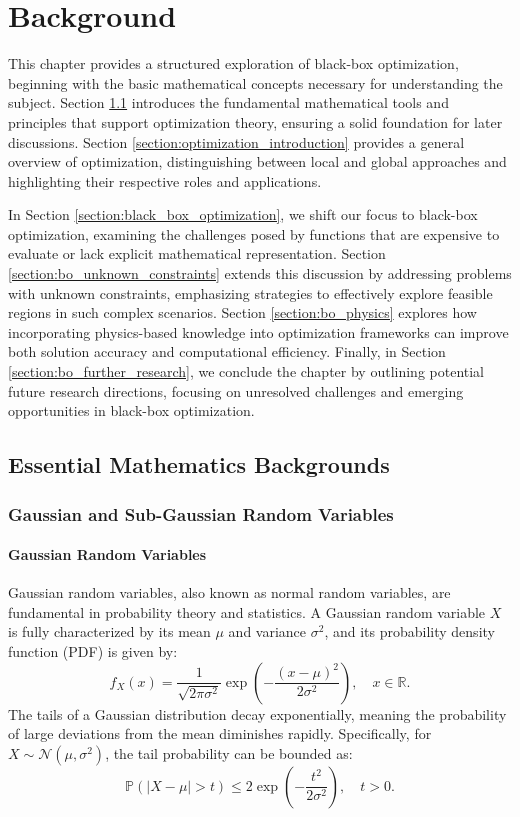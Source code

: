 \chapter{Background} %

\label{chap:background} 

This chapter provides a structured exploration of black-box optimization, beginning with the basic mathematical concepts necessary for understanding the subject. Section \ref{section:math_backgrounds} introduces the fundamental mathematical tools and principles that support optimization theory, ensuring a solid foundation for later discussions. Section \ref{section:optimization_introduction} provides a general overview of optimization, distinguishing between local and global approaches and highlighting their respective roles and applications.

In Section \ref{section:black_box_optimization}, we shift our focus to black-box optimization, examining the challenges posed by functions that are expensive to evaluate or lack explicit mathematical representation. Section \ref{section:bo_unknown_constraints} extends this discussion by addressing problems with unknown constraints, emphasizing strategies to effectively explore feasible regions in such complex scenarios. Section \ref{section:bo_physics} explores how incorporating physics-based knowledge into optimization frameworks can improve both solution accuracy and computational efficiency. Finally, in Section \ref{section:bo_further_research}, we conclude the chapter by outlining potential future research directions, focusing on unresolved challenges and emerging opportunities in black-box optimization.

\section{Essential Mathematics Backgrounds}
\label{section:math_backgrounds}
\subsection{Gaussian and Sub-Gaussian Random Variables}
\subsubsection{Gaussian Random Variables}  
Gaussian random variables, also known as normal random variables, are fundamental in probability theory and statistics. A Gaussian random variable \( X \) is fully characterized by its mean \( \mu \) and variance \( \sigma^2 \), and its probability density function (PDF) is given by:  
\[
f_X(x) = \frac{1}{\sqrt{2\pi \sigma^2}} \exp\left(-\frac{(x - \mu)^2}{2\sigma^2}\right), \quad x \in \mathbb{R}.
\]  
The tails of a Gaussian distribution decay exponentially, meaning the probability of large deviations from the mean diminishes rapidly. Specifically, for \( X \sim \mathcal{N}(\mu, \sigma^2) \), the tail probability can be bounded as:  
\[
\mathbb{P}(|X - \mu| > t) \leq 2 \exp\left(-\frac{t^2}{2\sigma^2}\right), \quad t > 0.
\]  

